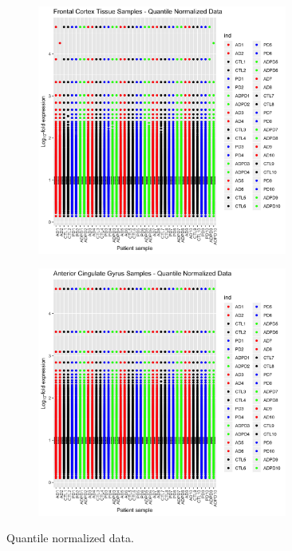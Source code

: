 \begin{figure}[H]
\begin{subfigure}[b]{0.5\linewidth}
\centering
\includegraphics[width=0.9\textwidth]{./Figures/Fig1b/Fig1b-FrontalCortex.png}\par
\end{subfigure}%
\begin{subfigure}[b]{0.5\linewidth}
\centering
\includegraphics[width=0.9\textwidth]{./Figures/Fig1b/Fig1b-AnteriorCingulateGyrus.png}\par
\end{subfigure}%
\caption{\label{fig1b}
Quantile normalized data.}
\end{figure}

